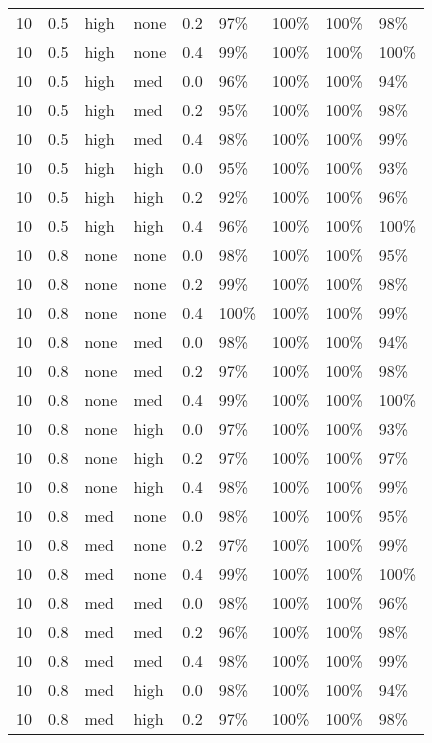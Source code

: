 \begin{longtable}{rrllrllll}
  10 & 0.5 & high & none & 0.2 & 97\% & 100\% & 100\% & 98\% \\ 
  10 & 0.5 & high & none & 0.4 & 99\% & 100\% & 100\% & 100\% \\ 
  10 & 0.5 & high & med & 0.0 & 96\% & 100\% & 100\% & 94\% \\ 
  10 & 0.5 & high & med & 0.2 & 95\% & 100\% & 100\% & 98\% \\ 
  10 & 0.5 & high & med & 0.4 & 98\% & 100\% & 100\% & 99\% \\ 
  10 & 0.5 & high & high & 0.0 & 95\% & 100\% & 100\% & 93\% \\ 
  10 & 0.5 & high & high & 0.2 & 92\% & 100\% & 100\% & 96\% \\ 
  10 & 0.5 & high & high & 0.4 & 96\% & 100\% & 100\% & 100\% \\ 
  10 & 0.8 & none & none & 0.0 & 98\% & 100\% & 100\% & 95\% \\ 
  10 & 0.8 & none & none & 0.2 & 99\% & 100\% & 100\% & 98\% \\ 
  10 & 0.8 & none & none & 0.4 & 100\% & 100\% & 100\% & 99\% \\ 
  10 & 0.8 & none & med & 0.0 & 98\% & 100\% & 100\% & 94\% \\ 
  10 & 0.8 & none & med & 0.2 & 97\% & 100\% & 100\% & 98\% \\ 
  10 & 0.8 & none & med & 0.4 & 99\% & 100\% & 100\% & 100\% \\ 
  10 & 0.8 & none & high & 0.0 & 97\% & 100\% & 100\% & 93\% \\ 
  10 & 0.8 & none & high & 0.2 & 97\% & 100\% & 100\% & 97\% \\ 
  10 & 0.8 & none & high & 0.4 & 98\% & 100\% & 100\% & 99\% \\ 
  10 & 0.8 & med & none & 0.0 & 98\% & 100\% & 100\% & 95\% \\ 
  10 & 0.8 & med & none & 0.2 & 97\% & 100\% & 100\% & 99\% \\ 
  10 & 0.8 & med & none & 0.4 & 99\% & 100\% & 100\% & 100\% \\ 
  10 & 0.8 & med & med & 0.0 & 98\% & 100\% & 100\% & 96\% \\ 
  10 & 0.8 & med & med & 0.2 & 96\% & 100\% & 100\% & 98\% \\ 
  10 & 0.8 & med & med & 0.4 & 98\% & 100\% & 100\% & 99\% \\ 
  10 & 0.8 & med & high & 0.0 & 98\% & 100\% & 100\% & 94\% \\ 
  10 & 0.8 & med & high & 0.2 & 97\% & 100\% & 100\% & 98\% \\ 

\end{longtable}
